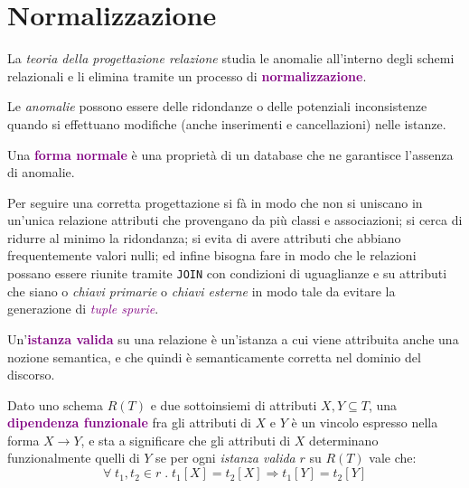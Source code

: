 \newpage

\section{Normalizzazione}

La \emph{teoria della progettazione relazione} studia le anomalie all'interno
degli schemi relazionali e li elimina tramite un processo di \textbf{\textcolor{purple}{normalizzazione}}.

Le \emph{anomalie} possono essere delle ridondanze o delle potenziali
inconsistenze quando si effettuano modifiche (anche inserimenti e cancellazioni) nelle istanze.

\begin{definition}
    Una \textbf{\textcolor{purple}{forma normale}} è una proprietà di un
    database che ne garantisce l'assenza di anomalie.
\end{definition}

Per seguire una corretta progettazione si fà in modo che non si uniscano in un'unica
relazione attributi che provengano da più classi e associazioni; si cerca di ridurre
al minimo la ridondanza; si evita di avere attributi che abbiano frequentemente
valori nulli; ed infine bisogna fare in modo che le relazioni possano essere riunite
tramite \verb|JOIN| con condizioni di uguaglianze e su attributi che siano o \emph{chiavi primarie}
o \emph{chiavi esterne} in modo tale da evitare la generazione di \emph{\textcolor{purple}{tuple spurie}}.

\begin{definition}
    Un'\textbf{\textcolor{purple}{istanza valida}} su una relazione è un'istanza a cui
    viene attribuita anche una nozione semantica, e che quindi è semanticamente corretta
    nel dominio del discorso.
\end{definition}

\begin{definition}
    Dato uno schema $R(T)$ e due sottoinsiemi di attributi $X, Y \subseteq T$, una \textbf{\textcolor{purple}{dipendenza funzionale}}
    fra gli attributi di $X$ e $Y$ è un vincolo espresso nella forma $X \rightarrow Y$, e sta a significare
    che gli attributi di $X$ determinano funzionalmente quelli di $Y$ se per ogni \emph{istanza valida} $r$ su $R(T)$ vale che:
    \begin{equation*}
        \forall \; t_1, t_2 \in r\;.\;t_1[X] = t_2[X] \Rightarrow t_1[Y] = t_2[Y]
    \end{equation*}
\end{definition}